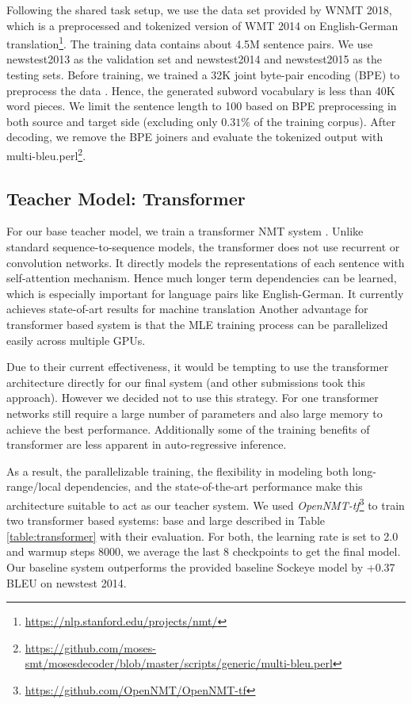 \documentclass[11pt,a4paper]{article}
\begin{document}
Following the shared task setup, we use the data set provided by WNMT
2018, which is a preprocessed and tokenized version of WMT 2014 on
English-German
translation\footnote{\url{https://nlp.stanford.edu/projects/nmt/}}. The
training data contains about 4.5M sentence pairs. We use newstest2013
as the validation set and newstest2014 and newstest2015 as the testing
sets. Before training, we trained a 32K joint byte-pair encoding (BPE)
to preprocess the data \cite{sennrich2015neural}. Hence, the generated
subword vocabulary is less than 40K word pieces. We limit the sentence
length to 100 based on BPE preprocessing in both source and target
side (excluding only $0.31\%$ of the training corpus). After decoding,
we remove the BPE joiners and evaluate the tokenized output with
multi-bleu.perl\footnote{\url{https://github.com/moses-smt/mosesdecoder/blob/master/scripts/generic/multi-bleu.perl}}.

\subsection{Teacher Model: Transformer}
\label{transformer}

For our base teacher model, we train a transformer NMT system
\cite{vaswani2017attention}.  Unlike standard sequence-to-sequence
models, the transformer does not use recurrent or convolution
networks.  It directly models the representations of each sentence
with self-attention mechanism.  Hence much longer term dependencies
can be learned, which is especially important for language pairs like
English-German. It currently achieves state-of-art results for machine
translation \cite{DBLP:journals/corr/abs-1803-02155} Another advantage
for transformer based system is that the MLE training process can be
parallelized easily across multiple GPUs.

Due to their current effectiveness, it would be tempting to use the
transformer architecture directly for our final system (and other
submissions took this approach). However we decided not to use this
strategy. For one transformer networks still require a large number of
parameters and also large memory to achieve the best
performance. Additionally some of the training benefits of transformer
are less apparent in auto-regressive inference.

As a result, the parallelizable training, the flexibility in modeling
both long-range/local dependencies, and the state-of-the-art
performance make this architecture suitable to act as our teacher
system. We used
\textit{OpenNMT-tf}\footnote{\url{https://github.com/OpenNMT/OpenNMT-tf}}
to train two transformer based systems: base and large described in
Table \ref{table:transformer} with their evaluation. For both, the
learning rate is set to 2.0 and warmup steps 8000, we average the last
8 checkpoints to get the final model. Our baseline system outperforms
the provided baseline Sockeye model by +0.37 BLEU on newstest 2014.
\end{document}
